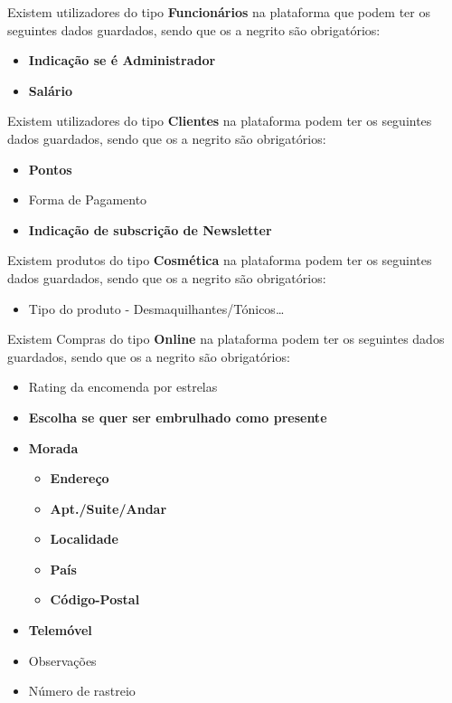 \documentclass[10pt,portuguese]{article}
\begin{document}
\par Existem utilizadores do tipo \textbf{Funcionários} na plataforma que podem ter os seguintes dados guardados, sendo que os a negrito são obrigatórios:

\begin{itemize}
    \item \textbf{Indicação se é Administrador}
    \item \textbf{Salário}
\end{itemize}

\clearpage

\par Existem utilizadores do tipo \textbf{Clientes} na plataforma podem ter os seguintes dados guardados, sendo que os a negrito são obrigatórios:

\begin{itemize}
    \item \textbf{Pontos}
    \item Forma de Pagamento
    \item \textbf{Indicação de subscrição de Newsletter}
\end{itemize}

\par Existem produtos do tipo \textbf{Cosmética} na plataforma podem ter os seguintes dados guardados, sendo que os a negrito são obrigatórios:


\begin{itemize}
    \item Tipo do produto - Desmaquilhantes/Tónicos…
\end{itemize}


\par Existem Compras do tipo \textbf{Online} na plataforma podem ter os seguintes dados guardados, sendo que os a negrito são obrigatórios:

\begin{itemize}
    \item Rating da encomenda por estrelas
    \item \textbf{Escolha se quer ser embrulhado como presente}
    \item \textbf{Morada}
    \begin{itemize}
        \item \textbf{Endereço}
        \item \textbf{Apt./Suite/Andar}
        \item \textbf{Localidade}
        \item \textbf{País}
        \item \textbf{Código-Postal}
    \end{itemize}
    \item \textbf{Telemóvel} 
    \item Observações
    \item Número de rastreio
\end{itemize}
\end{document}
